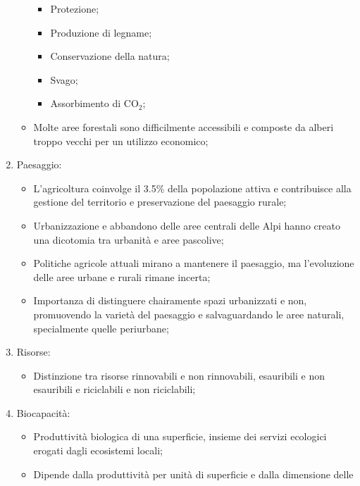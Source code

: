 \documentclass{article}
\begin{document}
\begin{enumerate}
\begin{itemize}
\begin{itemize}
                    \item Protezione;
                    \item Produzione di legname;
                    \item Conservazione della natura;
                    \item Svago;
                    \item Assorbimento di CO$_2$;
                \end{itemize}
            \item Molte aree forestali sono difficilmente accessibili e composte da alberi
                troppo vecchi per un utilizzo economico;
        \end{itemize}
    \item Paesaggio:
        \begin{itemize}
            \item L'agricoltura coinvolge il 3.5\% della popolazione attiva e contribuisce alla
                gestione del territorio e preservazione del paesaggio rurale;
            \item Urbanizzazione e abbandono delle aree centrali delle Alpi hanno creato una
                dicotomia tra urbanità e aree pascolive;
            \item Politiche agricole attuali mirano a mantenere il paesaggio, ma l'evoluzione 
                delle aree urbane e rurali rimane incerta;
            \item Importanza di distinguere chairamente spazi urbanizzati e non, promuovendo la
                varietà del paesaggio e salvaguardando le aree naturali, specialmente quelle
                periurbane;
        \end{itemize}
    \item Risorse:
        \begin{itemize}
            \item Distinzione tra risorse rinnovabili e non rinnovabili, esauribili e non
                esauribili e riciclabili e non riciclabili;
        \end{itemize}
    \item Biocapacità:
        \begin{itemize}
            \item Produttività biologica di una superficie, insieme dei servizi ecologici
                erogati dagli ecosistemi locali;
            \item Dipende dalla produttività per unità di superficie e dalla dimensione delle

\end{itemize}
\end{enumerate}
\end{document}
